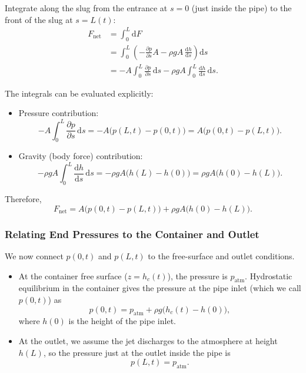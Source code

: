 \documentclass[11pt]{article}
\begin{document}
Integrate along the slug from the entrance at $s=0$ (just inside the pipe) to
the front of the slug at $s=L(t)$:
\begin{align*}
F_{\text{net}}
&= \int_0^{L} \mathrm{d}F \\
&= \int_0^{L} \left(
    -\frac{\partial p}{\partial s} A
    - \rho g A\,\frac{\mathrm{d}h}{\mathrm{d}s}
  \right) \mathrm{d}s \\
&= -A\int_0^{L} \frac{\partial p}{\partial s} \,\mathrm{d}s
   -\rho g A\int_0^{L} \frac{\mathrm{d}h}{\mathrm{d}s}\,\mathrm{d}s.
\end{align*}

The integrals can be evaluated explicitly:
\begin{itemize}
  \item Pressure contribution:
  \[
    -A\int_0^{L} \frac{\partial p}{\partial s} \,\mathrm{d}s
    = -A\bigl(p(L,t) - p(0,t)\bigr)
    = A\bigl(p(0,t) - p(L,t)\bigr).
  \]
  \item Gravity (body force) contribution:
  \[
    -\rho g A\int_0^{L} \frac{\mathrm{d}h}{\mathrm{d}s}\,\mathrm{d}s
    = -\rho g A \bigl(h(L) - h(0)\bigr)
    = \rho g A \bigl(h(0) - h(L)\bigr).
  \]
\end{itemize}
Therefore,
\begin{equation}
F_{\text{net}}
  = A\bigl(p(0,t) - p(L,t)\bigr)
    + \rho g A \bigl(h(0) - h(L)\bigr).
\label{eq:net-force-general}
\end{equation}

\subsubsection*{Relating End Pressures to the Container and Outlet}

We now connect $p(0,t)$ and $p(L,t)$ to the free-surface and outlet conditions.

\begin{itemize}
  \item At the container free surface ($z = h_c(t)$), the pressure is
        $p_{\text{atm}}$. Hydrostatic equilibrium in the container gives the
        pressure at the pipe inlet (which we call $p(0,t)$) as
        \[
        p(0,t) = p_{\text{atm}} + \rho g \bigl(h_c(t) - h(0)\bigr),
        \]
        where $h(0)$ is the height of the pipe inlet.

  \item At the outlet, we assume the jet discharges to the atmosphere at height
        $h(L)$, so the pressure just at the outlet inside the pipe is
        \[
        p(L,t) = p_{\text{atm}}.
        \]
\end{itemize}
\end{document}
